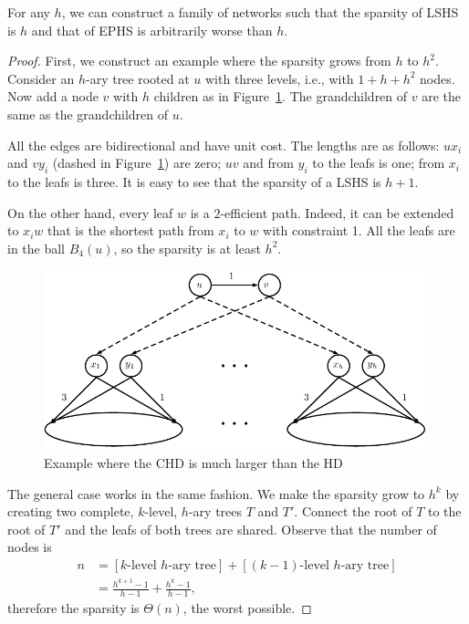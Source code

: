 \begin{proposition}\label{prop:treelike}
For any $h$, we can construct a family of networks such that the sparsity of LSHS is $h$ and that of EPHS is arbitrarily worse than $h$.
\end{proposition}
\begin{proof}
First, we construct an example where the sparsity grows from $h$ to $h^2$.
Consider an $h$-ary tree rooted at $u$ with three levels, i.e., with $1+h+h^2$ nodes.
Now add a node $v$ with $h$ children as in Figure~\ref{fig:treelike}. 
The grandchildren of $v$ are the same as the grandchildren of $u$.

All the edges are bidirectional and have unit cost.
The lengths are as follows: $ux_i$ and $vy_i$ (dashed in Figure~\ref{fig:treelike}) are zero; $uv$ and from $y_i$ to the leafs is one; from $x_i$ to the leafs is three.
It is easy to see that the sparsity of a LSHS is $h+1$.

On the other hand, every leaf $w$ is a $2$-efficient path.
Indeed, it can be extended to $x_iw$ that is the shortest path from $x_i$ to $w$ with constraint 1.
All the leafs are in the ball $B_4(u)$, so the sparsity is at least $h^2$.

\begin{figure}
\caption{Example where the CHD is much larger than the HD}
\label{fig:treelike}
\centering
\includegraphics[scale=0.6]{TexImg/Treelike.pdf}
\end{figure}

The general case works in the same fashion.
We make the sparsity grow to $h^k$ by creating two complete, $k$-level, $h$-ary trees $T$ and $T'$.
Connect the root of $T$ to the root of $T'$ and the leafs of both trees are shared.
Observe that the number of nodes is 
\begin{align*}
n &=[\text{$k$-level $h$-ary tree}] + [\text{$(k-1)$-level $h$-ary tree}]\\
&= \frac{h^{k+1}-1}{h-1} + \frac{h^k-1}{h-1},
\end{align*}
therefore the sparsity is $\Theta(n)$, the worst possible.
\end{proof}

